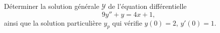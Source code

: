 
\begin{exercice}\label{exosession1-0005}

Déterminer la solution générale $\mathcal{Y}$ de l'équation différentielle 
\begin{equation*}
  9y''+y = 4x+1,
\end{equation*}
ainsi que la solution particulière $y_p$ qui vérifie $y(0) = 2$, $y'(0)=1$.


\end{exercice}

